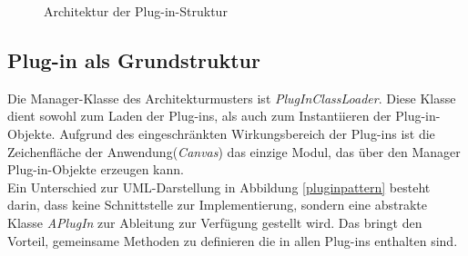 
\begin{figure}[htbp]
  \vspace{0.5cm}
  \centering
  \caption{Architektur der Plug-in-Struktur}
  \label{aplugin}
  \vspace{0.5cm}
\end{figure}

\subsection{Plug-in als Grundstruktur}
Die Manager-Klasse des Architekturmusters ist \textit{PlugInClassLoader}. Diese Klasse dient sowohl zum Laden der Plug-ins, als auch zum Instantiieren der Plug-in-Objekte. Aufgrund des eingeschränkten Wirkungsbereich der Plug-ins ist die Zeichenfläche der Anwendung(\textit{Canvas}) das einzige Modul, das über den Manager Plug-in-Objekte erzeugen kann.\\
Ein Unterschied zur UML-Darstellung in Abbildung \ref{pluginpattern} besteht darin, dass keine Schnittstelle zur Implementierung, sondern eine abstrakte Klasse \textit{APlugIn} zur Ableitung zur Verfügung gestellt wird. Das bringt den Vorteil, gemeinsame Methoden zu definieren die in allen Plug-ins enthalten sind.


